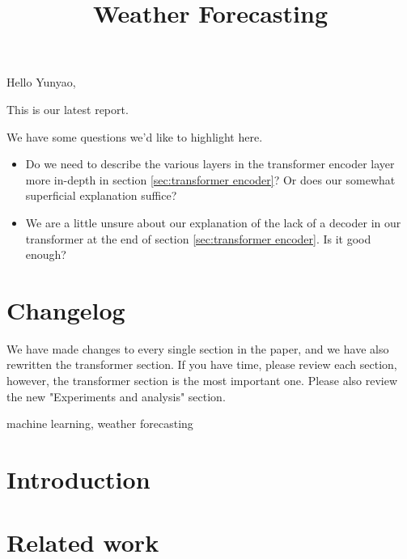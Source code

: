


Hello Yunyao,

This is our latest report.

We have some questions we'd like to highlight here.

\begin{itemize}
    \item Do we need to describe the various layers in the transformer encoder layer more in-depth in section \ref{sec:transformer encoder}? Or does our somewhat superficial explanation suffice? 
    \item We are a little unsure about our explanation of the lack of a decoder in our transformer at the end of section \ref{sec:transformer encoder}. Is it good enough?
\end{itemize}

\section{Changelog}
We have made changes to every single section in the paper, and we have also rewritten the transformer section. 
If you have time, please review each section, however, the transformer section is the most important one.
Please also review the new "Experiments and analysis" section.

\newpage

\title{Weather Forecasting}
\author{
    \and
    \and
    \and
}

\maketitle

\begin{abstract}
\end{abstract}

\begin{IEEEkeywords}
machine learning, weather forecasting
\end{IEEEkeywords}

\section{Introduction}


\section{Related work}\label{sec:relatedwork}




